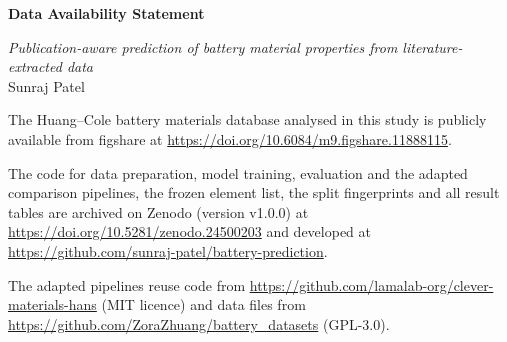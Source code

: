 \documentclass[11pt]{article}
\begin{document}
{\large\bfseries Data Availability Statement}

\emph{Publication-aware prediction of battery material properties from literature-extracted data}\\
Sunraj Patel

The Huang--Cole battery materials database analysed in this study is publicly available from figshare at \url{https://doi.org/10.6084/m9.figshare.11888115}.

The code for data preparation, model training, evaluation and the adapted comparison pipelines, the frozen element list, the split fingerprints and all result tables are archived on Zenodo (version v1.0.0) at \url{https://doi.org/10.5281/zenodo.24500203} and developed at \url{https://github.com/sunraj-patel/battery-prediction}.

The adapted pipelines reuse code from \url{https://github.com/lamalab-org/clever-materials-hans} (MIT licence) and data files from \url{https://github.com/ZoraZhuang/battery_datasets} (GPL-3.0).
\end{document}
